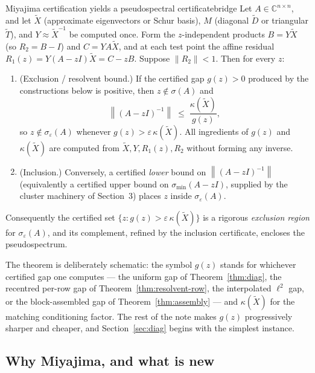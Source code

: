\documentclass[11pt, a4paper]{article}
\numberwithin{equation}{section}
\newcommand{\norm}[1]{\left\|#1\right\|}
\newcommand{\tX}{\widetilde{X}}
\newcommand{\tD}{\widetilde{D}}
\newcommand{\tT}{\widetilde{T}}
\newcommand{\C}{\mathbb{C}}
\begin{document}
\begin{theorem}{Miyajima certification yields a pseudospectral certificate}{bridge}
  Let $A \in \C^{n\times n}$, and let $\tX$ (approximate eigenvectors or Schur
  basis), $M$ (diagonal $\tD$ or triangular $\tT$), and $Y \approx \tX^{-1}$ be
  computed once.  Form the $z$-independent products $B = Y\tX$ (so $R_2 = B -
  I$) and $C = YA\tX$, and at each test point the affine residual $R_1(z) = Y(A
  - zI)\tX = C - zB$.  Suppose $\norm{R_2} < 1$.  Then for every $z$:
  \begin{enumerate}
    \item \textup{(Exclusion / resolvent bound.)} If the certified gap
      $g(z) > 0$ produced by the constructions below is positive, then $z
      \notin \sigma(A)$ and
      \[
        \norm{(A - zI)^{-1}} \;\le\; \frac{\kappa(\tX)}{g(z)},
      \]
      so $z \notin \sigma_\varepsilon(A)$ whenever $g(z) > \varepsilon\,
      \kappa(\tX)$.  All ingredients of $g(z)$ and $\kappa(\tX)$ are computed
      from $\tX, Y, R_1(z), R_2$ without forming any inverse.
    \item \textup{(Inclusion.)} Conversely, a certified \emph{lower} bound on
      $\norm{(A - zI)^{-1}}$ (equivalently a certified upper bound on
      $\sigma_{\min}(A - zI)$, supplied by the cluster machinery of Section~3)
      places $z$ inside $\sigma_\varepsilon(A)$.
  \end{enumerate}
  Consequently the certified set $\{ z : g(z) > \varepsilon\,\kappa(\tX) \}$ is a
  rigorous \emph{exclusion region} for $\sigma_\varepsilon(A)$, and its
  complement, refined by the inclusion certificate, encloses the pseudospectrum.
\end{theorem}

\noindent
The theorem is deliberately schematic: the symbol $g(z)$ stands for whichever
certified gap one computes --- the uniform gap of Theorem~\ref{thm:diag}, the
recentred per-row gap of Theorem~\ref{thm:resolvent-row}, the interpolated
$\ell^2$ gap, or the block-assembled gap of Theorem~\ref{thm:assembly} --- and
$\kappa(\tX)$ for the matching conditioning factor.  The rest of the note makes
$g(z)$ progressively sharper and cheaper, and Section~\ref{sec:diag} begins with
the simplest instance.

\subsection{Why Miyajima, and what is new}
\end{document}
